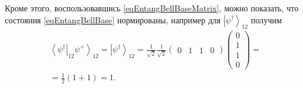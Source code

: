 Кроме этого, воспользовавшись \eqref{eqEntangBellBaseMatrix}, можно
показать, что состояния \eqref{eqEntangBellBase} нормированы, например
для $\left|\psi^{\dag}\right>_{12}$ получим 
\begin{eqnarray}
\left<\psi^{\dag}\right|_{12}\left.\psi^{+}\right>_{12} = 
  \left|\psi^{\dag}\right>_{12} = 
  \frac{1}{\sqrt{2}} \frac{1}{\sqrt{2}}
  \left(
  \begin{array}{cccc}
    0 & 1 & 1 & 0
  \end{array}
  \right)   
  \left(
  \begin{array}{c}
    0 \\
    1 \\
    1 \\
    0
  \end{array}
  \right) = 
\nonumber \\
=
  \frac{1}{2}\left(1 + 1\right) = 1.
\nonumber 
\end{eqnarray}
